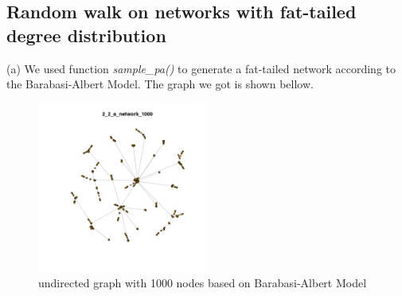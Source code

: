 \documentclass[draftcls,12pt,onecolumn]{IEEEtran}
\begin{document}
\subsection{Random walk on networks with fat-tailed degree distribution}
(a) We used function \emph{sample\_pa()} to generate a fat-tailed network according to the Barabasi-Albert Model. The graph we got is shown bellow.
\begin{figure}[H]
\centering
\includegraphics[width=0.5\textwidth]{2_2_a_network_1000}
\caption{undirected graph with 1000 nodes based on Barabasi-Albert Model}
\end{figure}
\end{document}
